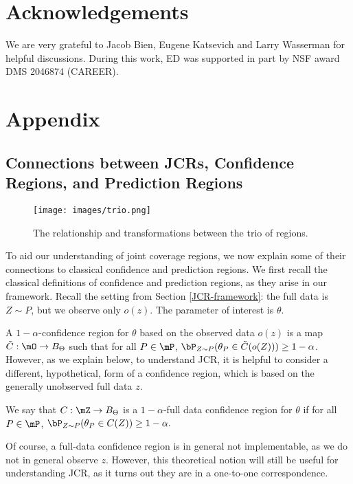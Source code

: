 \documentclass[english]{article}
\begin{document}
\section*{Acknowledgements}

We are very grateful to Jacob Bien, Eugene Katsevich and Larry Wasserman for helpful discussions.
During this work, ED was supported in part by NSF award DMS 2046874 (CAREER).


\section{Appendix}\label{appendix}

\subsection{Connections between JCRs, Confidence Regions, and Prediction Regions}
\label{conn}
\begin{figure}%
    \centering
    \texttt{[image: images/trio.png]}
    \caption{The relationship and transformations between the trio of regions.}
    \label{fig:trio}
\end{figure}
To aid our understanding of joint coverage regions, we now explain some of their connections to classical confidence and prediction regions. 
We first recall the classical definitions of confidence and prediction regions, as they arise in our framework.
Recall the setting from Section \ref{JCR-framework}:
the full data is $Z\sim P$, but we observe only $o(z)$.
The parameter of interest is $\theta$.

A $1-\alpha$-confidence region  for $\theta$ based on the observed data $o(z)$
is a map $\tilde C: \mO \to B_\Theta$ 
such that for all $P\in \mP$, $\bP_{Z \sim P}(\theta_P \in \tilde C(o(Z)) ) \ge 1-\alpha$.
However,
as we explain below, 
to understand JCR, it is helpful to consider a different, hypothetical, form of a confidence region, which is based on the generally unobserved full data $z$.

\begin{definition} \label{def-conf}
    We say that $C:\mZ\to B_\Theta$ 
    is a $1-\alpha$-full data confidence region for $\theta$ if for all $P\in \mP$,
    $\bP_{Z \sim P}(\theta_P \in C(Z) ) \ge 1-\alpha.$
\end{definition}
Of course, a full-data confidence region is in general not implementable, as 
we do not in general observe $z$. However, this theoretical notion will still be useful for understanding JCR, as it turns out they are in a one-to-one correspondence.
\end{document}
